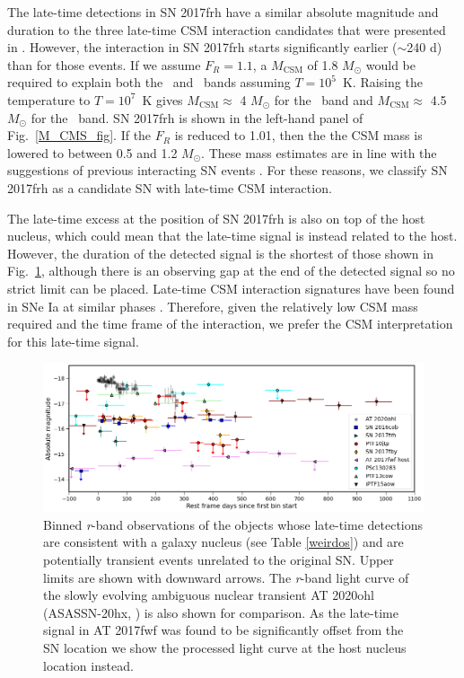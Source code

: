\documentclass[a4paper,oneside,12pt, class=Latex/Classes/PhDthesisPSnPDF, crop=false]{standalone}
\begin{document}
The late-time detections in SN 2017frh have a similar absolute magnitude and duration to the three late-time CSM interaction candidates that were presented in \citet{Terwel_2024_paper1}. However, the interaction in SN 2017frh starts significantly earlier ($\sim$240 d) than for those events. If we assume $F_R = 1.1$, a $M_\text{CSM}$ of 1.8 $M_\odot$ would be required to explain both the \ztfg\ and \ztfr\ bands assuming $T=10^5$~K. Raising the temperature to $T=10^7$~K gives $M_\text{CSM}\approx$ 4 $M_\odot$ for the \ztfg\ band and $M_\text{CSM}\approx$ 4.5 $M_\odot$ for the \ztfr\ band. SN 2017frh is shown in the left-hand panel of Fig.~\ref{M_CMS_fig}. If the $F_R$ is reduced to 1.01, then the the CSM mass is lowered to between 0.5 and 1.2 $M_\odot$. These mass estimates are in line with the suggestions of previous interacting SN events \citep{PTF11kx, Inserra_2016}. For these reasons, we classify SN 2017frh as a candidate SN with late-time CSM interaction.

The late-time excess at the position of SN 2017frh is also on top of the host nucleus, which could mean that the late-time signal is instead related to the host. However, the duration of the detected signal is the shortest of those shown in Fig.~\ref{ANT_comp}, although there is an observing gap at the end of the detected signal so no strict limit can be placed. Late-time CSM interaction signatures have been found in SNe Ia at similar phases \citep{2015cp}. Therefore, given the relatively low CSM mass required and the time frame of the interaction, we prefer the CSM interpretation for this late-time signal.


\begin{figure}
    \centering
    \includegraphics[width=\textwidth]{../Images/chapter_4/ANT_comp.png}
    \caption{Binned \textit{r}-band observations of the objects whose late-time detections are consistent with a galaxy nucleus (see Table \ref{weirdos}) and are potentially transient events unrelated to the original SN. Upper limits are shown with downward arrows. The \textit{r}-band light curve of the slowly evolving ambiguous nuclear transient AT 2020ohl (ASASSN-20hx, \citealt{2020ohl_Hinkle}) is also shown for comparison. As the late-time signal in AT 2017fwf was found to be significantly offset from the SN location we show the processed light curve at the host nucleus location instead.}
    \label{ANT_comp}
\end{figure}
\end{document}
